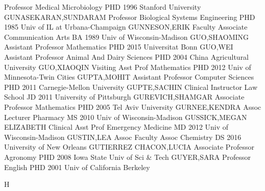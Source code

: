 \documentclass[
]{article}
\begin{document}
 \textbar Professor \textbar Medical Microbiology
\textbar PHD 1996 Stanford University \textbar GUNASEKARAN,SUNDARAM
\textbar{}  \textbar Professor \textbar Biological Systems
Engineering \textbar PHD 1985 Univ of IL at Urbana-Champaign
\textbar GUNNESON,ERIK \textbar{}  \textbar Faculty
Associate \textbar Communication Arts \textbar BA 1989 Univ of
Wisconsin-Madison \textbar GUO,SHAOMING \textbar{} 
\textbar Assistant Professor \textbar Mathematics \textbar PHD 2015
Universitat Bonn \textbar GUO,WEI \textbar{} 
\textbar Assistant Professor \textbar Animal And Dairy Sciences
\textbar PHD 2004 China Agricultural University \textbar GUO,XIAOQIN
\textbar{}  \textbar Visiting Asst Prof \textbar Mathematics
\textbar PHD 2012 Univ of Minnesota-Twin Cities \textbar GUPTA,MOHIT
\textbar{}  \textbar Assistant Professor \textbar Computer
Sciences \textbar PHD 2011 Carnegie-Mellon University
\textbar GUPTE,SACHIN \textbar{}  \textbar Clinical
Instructor \textbar Law School \textbar JD 2011 University of Pittsburgh
\textbar GUREVICH,SHAMGAR \textbar{}  \textbar Associate
Professor \textbar Mathematics \textbar PHD 2005 Tel Aviv University
\textbar GURNEE,KENDRA \textbar{}  \textbar Assoc Lecturer
\textbar Pharmacy \textbar MS 2010 Univ of Wisconsin-Madison
\textbar GUSSICK,MEGAN ELIZABETH \textbar{} 
\textbar Clinical Asst Prof \textbar Emergency Medicine \textbar MD 2012
Univ of Wisconsin-Madison \textbar GUSTIN,LEA \textbar{} 
\textbar Assoc Faculty Assoc \textbar Chemistry \textbar DS 2016
University of New Orleans \textbar GUTIERREZ CHACON,LUCIA \textbar{}
 \textbar Associate Professor \textbar Agronomy \textbar PHD
2008 Iowa State Univ of Sci \& Tech \textbar GUYER,SARA \textbar{}
 \textbar Professor \textbar English \textbar PHD 2001 Univ
of California Berkeley \textbar{}

H

\textbar{}  \textbar{}
\end{document}
